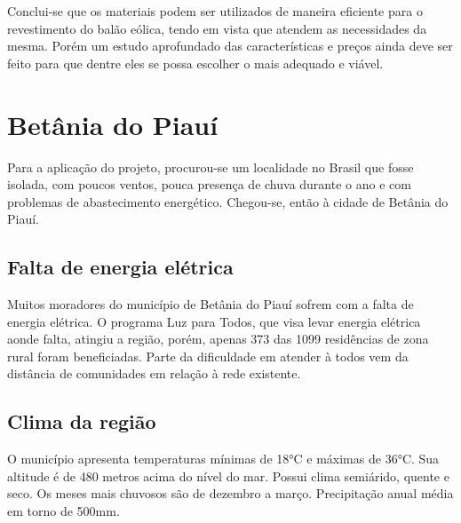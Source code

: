 Conclui-se que os materiais podem ser utilizados de maneira eficiente para o revestimento do balão eólica, tendo em vista que atendem as necessidades da mesma. Porém um estudo aprofundado das características e preços ainda deve ser feito para que dentre eles se possa  escolher o mais adequado e viável.

\chapter{Betânia do Piauí}

Para a aplicação do projeto, procurou-se um localidade no Brasil que fosse isolada, com poucos ventos, pouca presença de chuva durante o ano e com problemas de abastecimento energético. Chegou-se, então à cidade de Betânia do Piauí.


\section{Falta de energia elétrica}
   Muitos moradores do município de Betânia do Piauí sofrem com a falta de energia elétrica. O programa Luz para Todos, que visa levar energia elétrica aonde falta, atingiu a região, porém, apenas 373 das 1099 residências de zona rural foram beneficiadas. Parte da dificuldade em atender à todos vem da distância de comunidades em relação à rede existente. 

\section{Clima da região}
O município apresenta temperaturas mínimas de 18°C e máximas de 36°C. Sua altitude é de 480 metros acima do nível do mar. Possui clima semiárido, quente e seco. Os meses mais chuvosos são de dezembro a março. Precipitação anual média em torno de 500mm. 


